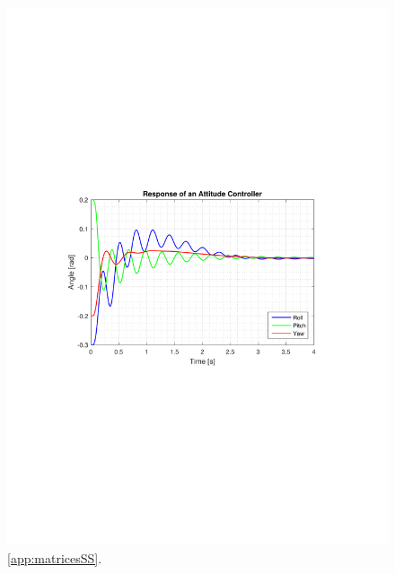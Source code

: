 \begin{figure}[H]
	\centering
	\includegraphics[scale=0.8]{figures/ssEqObsHigh.pdf}
	\caption{\autoref{app:matricesSS}.}
	\label{fig:TranslationalControlDiagram}
\end{figure}
